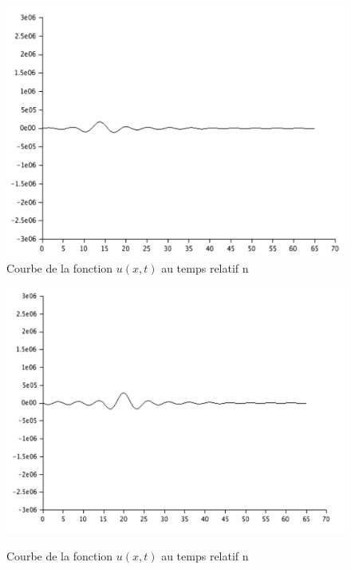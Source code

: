 \documentclass[a4paper,12pt]{report}
\begin{document}
\begin{enumerate}
\begin{figure}[h!]
\begin{minipage}[b]{0.40\linewidth}
      \includegraphics[scale=0.3]{Piano3.png}\\
	  \caption{Courbe  de la fonction $u(x,t)$ au temps relatif n}
   \end{minipage}\hfill
    \begin{minipage}[b]{0.48\linewidth}
      \includegraphics[scale=0.3]{Piano4.png}\\
	  \caption{Courbe  de la fonction $u(x,t)$ au temps relatif n}
   \end{minipage}
   \begin{minipage}[b]{0.40\linewidth}

\end{minipage}
\end{figure}
\end{enumerate}
\end{document}
